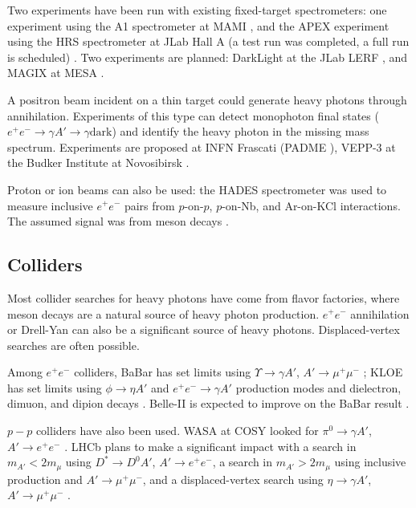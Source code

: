 Two experiments have been run with existing fixed-target spectrometers: one experiment using the A1 spectrometer at MAMI \cite{merkel_search_2014}, and the APEX experiment using the HRS spectrometer at JLab Hall A (a test run was completed, a full run is scheduled) \cite{essig_electron_2011,abrahamyan_search_2011}.
Two experiments are planned: DarkLight at the JLab LERF \cite{balewski_darklight_2014}, and MAGIX at MESA \cite{denig_recent_2016}.

A positron beam incident on a thin target could generate heavy photons through annihilation.
Experiments of this type can detect monophoton final states ($e^+e^- \to \gamma A' \to \gamma \mathrm{dark}$) and identify the heavy photon in the missing mass spectrum. Experiments are proposed at INFN Frascati (PADME \cite{raggi_padme_2015}), VEPP-3 at the Budker Institute at Novosibirsk \cite{wojtsekhowski_searching_2012}.

Proton or ion beams can also be used: the HADES spectrometer was used to measure inclusive $e^+e^-$ pairs from $p$-on-$p$, $p$-on-Nb, and Ar-on-KCl interactions.
The assumed signal was from meson decays \cite{hades_collaboration_searching_2013}.

\subsection{Colliders}
Most collider searches for heavy photons have come from flavor factories, where meson decays are a natural source of heavy photon production.
$e^+e^-$ annihilation or Drell-Yan can also be a significant source of heavy photons.
Displaced-vertex searches are often possible.

Among $e^+e^-$ colliders, BaBar has set limits using $\Upsilon \to \gamma A'$, $A'\to\mu^+\mu^-$ \cite{babar_collaboration_search_2009,soffer_constraints_2014}; KLOE has set limits using $\phi\to \eta A'$ and $e^+e^- \to \gamma A'$ production modes and dielectron, dimuon, and dipion decays \cite{collaboration_search_2012,collaboration_limit_2013,babusci_search_2014,anastasi_limit_2015,collaboration_limit_2016}.
Belle-II is expected to improve on the BaBar result \cite{inguglia_belle_2016}.

$p-p$ colliders have also been used. WASA at COSY looked for $\pi^0 \to \gamma A'$, $A'\to e^+e^-$ \cite{collaboration_search_2013}.
LHCb plans to make a significant impact with a search in $m_{A'}<2m_\mu$ using $D^* \to D^0 A'$, $A'\to e^+e^-$, a search in $m_{A'}>2m_\mu$ using inclusive production and $A'\to \mu^+\mu^-$, and a displaced-vertex search using $\eta \to \gamma A'$, $A'\to \mu^+\mu^-$ \cite{ilten_dark_2015,ilten_inclusive_2016}.

